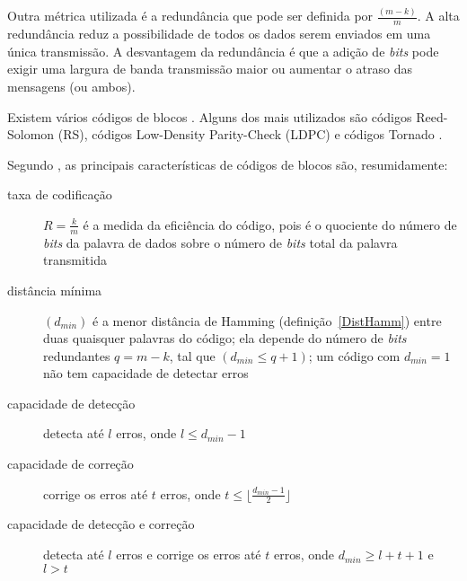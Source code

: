Outra métrica utilizada é a redundância que pode ser definida por
$\frac{(m - k)}{m}$. A alta redundância reduz a possibilidade de
todos os dados serem enviados em uma única transmissão. A desvantagem
da redundância é que a adição de \emph{bits} pode exigir uma largura
de banda transmissão maior ou aumentar o atraso das mensagens (ou
ambos).



Existem vários códigos de blocos \cite{Byers:1998, Kubiatowicz:2000}. Alguns dos mais utilizados são códigos Reed-Solomon (RS), códigos Low-Density Parity-Check (LDPC) e códigos Tornado \cite{Mitzenmacher:2004, RTAD:2007}.


Segundo \cite{AF:2010}, as principais características de códigos de blocos são, resumidamente:

\begin{description}
   \item [taxa de codificação] $R = \frac{k}{m}$ é a medida da eficiência do código, pois é o quociente do número de \emph{bits} da palavra de dados sobre o número de \emph{bits} total da palavra transmitida
   \item [distância mínima] $(d_{min})$ é a menor distância de Hamming (definição~\ref{DistHamm}) entre duas quaisquer palavras do código; ela depende do número de \emph{bits} redundantes $q = m - k$, tal que  $(d_{min} \leq q + 1)$; um código com $d_{min} = 1$ não tem capacidade de detectar erros
   \item [capacidade de detecção] detecta até $l$ erros, onde $l \leq d_{min} - 1$
   \item [capacidade de correção] corrige os erros até $t$ erros, onde $ t \leq \lfloor \frac{d_{min} - 1}{2} \rfloor$
   \item [capacidade de detecção e correção] detecta até $l$ erros e corrige os erros até $t$ erros, onde $d_{min} \geq l + t + 1$ e $l > t$
\end{description}

